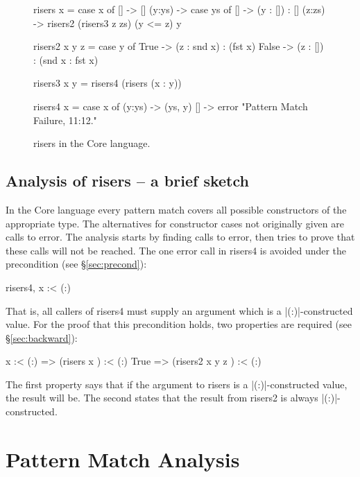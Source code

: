 \documentclass[preprint]{sigplanconf}
\newcommand{\C}[1]{\textsf{#1}}
\begin{document}
\begin{figure}
\begin{code}
risers x = case x of
    [] -> []
    (y:ys) ->  case ys of
         [] -> (y : []) : []
         (z:zs) -> risers2 (risers3 z zs) (y <= z) y

risers2 x y z =  case y of
    True -> (z : snd x) : (fst x)
    False -> (z : []) : (snd x : fst x)

risers3 x y = risers4 (risers (x : y))

risers4 x = case x of
    (y:ys) -> (ys, y)
    [] -> error "Pattern Match Failure, 11:12."
\end{code}
\caption{\C{risers} in the Core language.}
\label{fig:risers_core}
\end{figure}

\subsection{Analysis of \C{risers} -- a brief sketch}

In the Core language every pattern match covers all possible constructors of the appropriate type. The alternatives for constructor cases not originally given are calls to \C{error}. The analysis starts by finding calls to \C{error}, then tries to prove that these calls will not be reached. The one \C{error} call in \C{risers4} is avoided under the precondition (see \S\ref{sec:precond}):

\begin{code}
risers4, x :< (:)
\end{code}

That is, all callers of \C{risers4} must supply an argument which is a |(:)|-constructed value. For the proof that this precondition holds, two properties are required (see \S\ref{sec:backward}):

\begin{code}
x :< (:)  => (risers x       ) :< (:)
True      => (risers2 x y z  ) :< (:)
\end{code}

\noindent The first property says that if the argument to \C{risers} is a |(:)|-constructed value, the result will be. The second states that the result from \C{risers2} is always |(:)|-constructed.

\section{Pattern Match Analysis}
\label{sec:manipulate}
\end{document}
